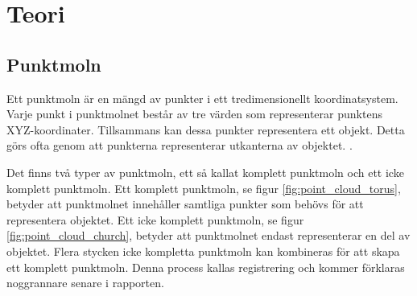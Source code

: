 \chapter{Teori}
\label{cha:theory}

\section{Punktmoln}
Ett punktmoln är en mängd av punkter i ett tredimensionellt koordinatsystem. Varje punkt i punktmolnet består av tre värden som representerar punktens XYZ-koordinater. Tillsammans kan dessa punkter representera ett objekt. Detta görs ofta genom att punkterna representerar utkanterna av objektet. \cite{point_cloud}. 

Det finns två typer av punktmoln, ett så kallat komplett punktmoln och ett icke komplett punktmoln. Ett komplett punktmoln, se figur \ref{fig:point_cloud_torus}, betyder att punktmolnet innehåller samtliga punkter som behövs för att representera objektet. Ett icke komplett punktmoln, se figur \ref{fig:point_cloud_church}, betyder att punktmolnet endast representerar en del av objektet. Flera stycken icke kompletta punktmoln kan kombineras för att skapa ett komplett punktmoln. Denna process kallas registrering och kommer förklaras noggrannare senare i rapporten.

